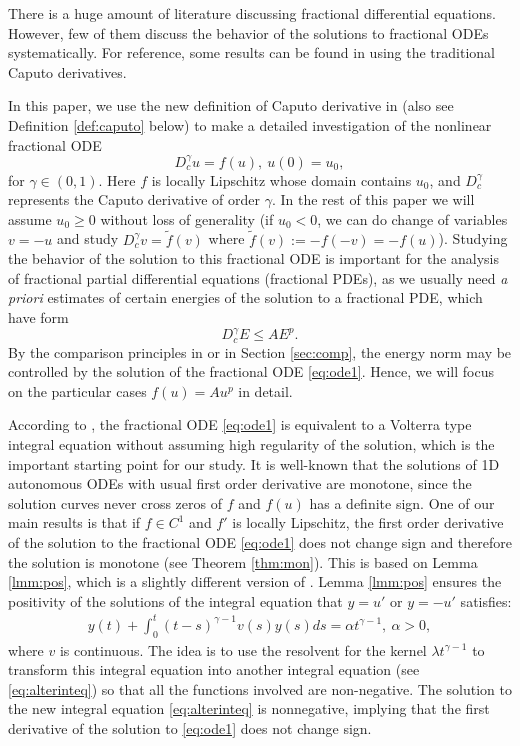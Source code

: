 \documentclass[12pt]{amsart}%
\theoremstyle{definition}
\theoremstyle{remark}
\renewcommand{\ge}{\geqslant}
\renewcommand{\le}{\leqslant}
\begin{document}
There is a huge amount of literature discussing fractional differential equations. However, few of them discuss the behavior of the solutions to fractional ODEs systematically. For reference, some results can be found in \cite{df02, diethelm10} using the traditional Caputo derivatives. 

In this paper, we use the new definition of Caputo derivative in \cite{liliu16} (also see Definition \ref{def:caputo} below) to make a detailed investigation of the nonlinear fractional ODE 
\begin{equation}\label{eq:ode1}
D_c^{\gamma}u= f(u), ~ u(0)=u_0,
\end{equation}
for $\gamma\in (0, 1)$. Here $f$ is locally Lipschitz whose domain contains $u_0$, and $D_c^{\gamma}$ represents the Caputo derivative of order $\gamma$. In the rest of this paper we will assume $u_0\ge 0$ without loss of generality (if $u_0<0$, we can do change of variables $v=-u$ and study $D_c^{\gamma}v=\tilde{f}(v)$ where $\tilde{f}(v):=-f(-v)=-f(u)$). Studying the behavior of the solution to this fractional ODE is important for the analysis of fractional partial differential equations (fractional PDEs), as we usually need {\it a priori} estimates of certain energies of the solution to a fractional PDE, which have form
\[
D_c^{\gamma}E\le AE^p.
\]
By the comparison principles in \cite{liliu16} or in Section \ref{sec:comp}, the energy norm may be controlled by the solution of the fractional ODE \eqref{eq:ode1}. Hence, we will focus on the particular cases $f(u)=Au^p$ in detail.

According to \cite{liliu16}, the fractional ODE \eqref{eq:ode1} is equivalent to a Volterra type integral equation without assuming high regularity of the solution, which is the important starting point for our study. It is well-known that the solutions of 1D autonomous ODEs with usual first order derivative are monotone,  since the solution curves never cross zeros of $f$ and $f(u)$ has a definite sign. One of our main results is that if $f\in C^1$ and $f'$ is locally Lipschitz, the first order derivative of the solution to the fractional ODE \eqref{eq:ode1} does not change sign and therefore the solution is monotone (see Theorem \ref{thm:mon}). This is based on Lemma \ref{lmm:pos}, which is a slightly different version of \cite[Theorem 1]{weis75}. Lemma \ref{lmm:pos} ensures the positivity of the solutions of the integral equation that $y=u'$ or $y=-u'$ satisfies:
\begin{gather*}
y(t)+\int_0^t(t-s)^{\gamma-1}v(s)y(s)ds=\alpha t^{\gamma-1}, ~\alpha>0,
\end{gather*}
where $v$ is continuous. The idea is to use the resolvent for the kernel $\lambda t^{\gamma-1}$ to transform this integral equation into another integral equation (see \eqref{eq:alterinteq}) so that all the functions involved are non-negative. The solution to the new integral equation \eqref{eq:alterinteq} is nonnegative, implying that the first derivative of the solution to \eqref{eq:ode1} does not change sign. 
\end{document}
